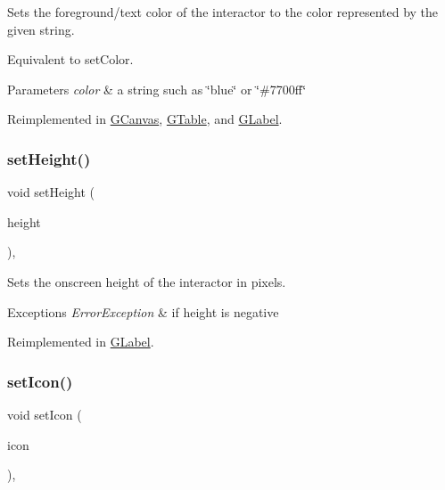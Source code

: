 Sets the foreground/text color of the interactor to the color represented by the given string. 

Equivalent to set\+Color. 
\begin{DoxyParams}{Parameters}
{\em color} & a string such as \char`\"{}blue\char`\"{} or \char`\"{}\#7700ff\char`\"{} \\
\hline
\end{DoxyParams}


Reimplemented in \mbox{\hyperlink{classGCanvas_a8afbcf1f47750fb4c717f9ff36540235}{G\+Canvas}}, \mbox{\hyperlink{classGTable_a8afbcf1f47750fb4c717f9ff36540235}{G\+Table}}, and \mbox{\hyperlink{classGLabel_a8afbcf1f47750fb4c717f9ff36540235}{G\+Label}}.

\mbox{\label{classGInteractor_a9e280bfc4544dfaf8e4376c4e1a74357}} 
\subsubsection{\texorpdfstring{set\+Height()}{setHeight()}}
{\footnotesize\ttfamily void set\+Height (\begin{DoxyParamCaption}\item[{double}]{height }\end{DoxyParamCaption})\hspace{0.3cm}{\ttfamily [virtual]}, {\ttfamily [inherited]}}



Sets the onscreen height of the interactor in pixels. 


\begin{DoxyExceptions}{Exceptions}
{\em Error\+Exception} & if height is negative \\
\hline
\end{DoxyExceptions}


Reimplemented in \mbox{\hyperlink{classGLabel_a5eead864d1249c4406f32f9944ed1503}{G\+Label}}.

\mbox{\label{classGInteractor_a542abfcd7261751352af129c7215ecda}} 
\subsubsection{\texorpdfstring{set\+Icon()}{setIcon()}\hspace{0.1cm}{\footnotesize\ttfamily [1/3]}}
{\footnotesize\ttfamily void set\+Icon (\begin{DoxyParamCaption}\item[{const Q\+Icon \&}]{icon }\end{DoxyParamCaption})\hspace{0.3cm}{\ttfamily [virtual]}, {\ttfamily [inherited]}}



